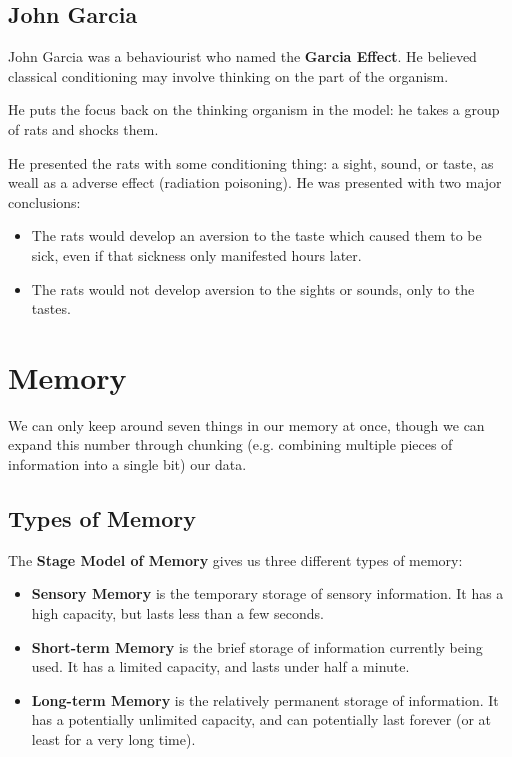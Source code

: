 \documentclass[12pt]{article}
\begin{document}
\subsection*{John Garcia}
John Garcia was a behaviourist who named the {\bf Garcia Effect}. He believed classical conditioning may involve thinking on the part of the organism.

He puts the focus back on the thinking organism in the model: he takes a group of rats and shocks them.

He presented the rats with some conditioning thing: a sight, sound, or taste, as weall as a adverse effect (radiation poisoning). He was presented with two major conclusions:

\begin{itemize}
\item The rats would develop an aversion to the taste which caused them to be sick, even if that sickness only manifested hours later.
\item The rats would not develop aversion to the sights or sounds, only to the tastes.
\end{itemize}

\section*{Memory}
We can only keep around seven things in our memory at once, though we can expand this number through chunking (e.g. combining multiple pieces of information into a single bit) our data.

\subsection*{Types of Memory}
The {\bf Stage Model of Memory} gives us three different types of memory:
\begin{itemize}
\item {\bf Sensory Memory} is the temporary storage of sensory information. It has a high capacity, but lasts less than a few seconds.
\item {\bf Short-term Memory} is the brief storage of information currently being used. It has a limited capacity, and lasts under half a minute.
\item {\bf Long-term Memory} is the relatively permanent storage of information. It has a potentially unlimited capacity, and can potentially last forever (or at least for a very long time).
\end{itemize}
\end{document}
